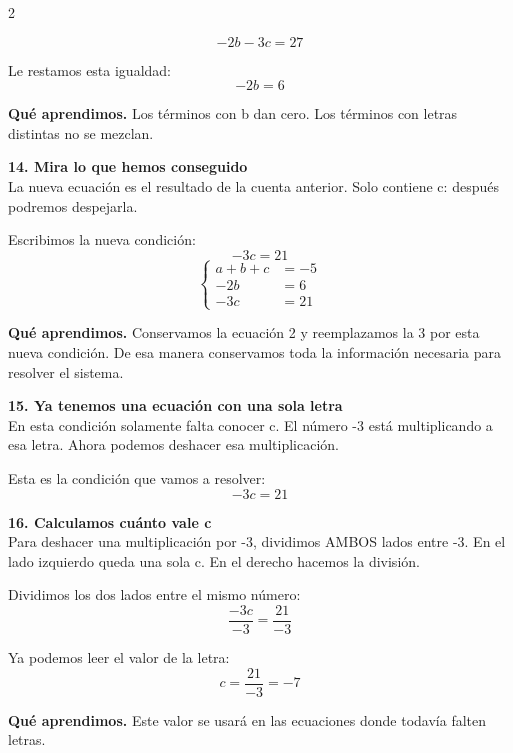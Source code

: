 \documentclass[11pt,a4paper,landscape]{article}
\begin{document}
\begin{multicols*}{2}
\begin{minipage}{\linewidth}
\[-2b - 3c = 27\]
\par\smallskip Le restamos esta igualdad:
\[-2b = 6\]
\par\smallskip\textbf{Qué aprendimos.} Los términos con b dan cero. Los términos con letras distintas no se mezclan.
\end{minipage}\par\medskip
\noindent\begin{minipage}{\linewidth}\textbf{14. Mira lo que hemos conseguido}\\[2pt]La nueva ecuación es el resultado de la cuenta anterior. Solo contiene c: después podremos despejarla.
\par\smallskip Escribimos la nueva condición:
\[-3c = 21\]
\[\left\{\begin{aligned}a + b + c &= -5\\-2b &= 6\\-3c &= 21\end{aligned}\right.\]
\par\smallskip\textbf{Qué aprendimos.} Conservamos la ecuación 2 y reemplazamos la 3 por esta nueva condición. De esa manera conservamos toda la información necesaria para resolver el sistema.
\end{minipage}\par\medskip
\noindent\begin{minipage}{\linewidth}\textbf{15. Ya tenemos una ecuación con una sola letra}\\[2pt]En esta condición solamente falta conocer c. El número -3 está multiplicando a esa letra. Ahora podemos deshacer esa multiplicación.
\par\smallskip Esta es la condición que vamos a resolver:
\[-3c = 21\]
\end{minipage}\par\medskip
\noindent\begin{minipage}{\linewidth}\textbf{16. Calculamos cuánto vale c}\\[2pt]Para deshacer una multiplicación por -3, dividimos AMBOS lados entre -3. En el lado izquierdo queda una sola c. En el derecho hacemos la división.
\par\smallskip Dividimos los dos lados entre el mismo número:
\[\frac{-3c}{-3}=\frac{21}{-3}\]
\par\smallskip Ya podemos leer el valor de la letra:
\[c=\frac{21}{-3}=-7\]
\par\smallskip\textbf{Qué aprendimos.} Este valor se usará en las ecuaciones donde todavía falten letras.
\end{minipage}\par\medskip

\end{multicols*}
\end{document}
